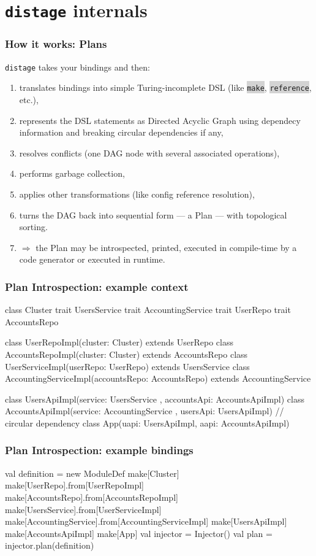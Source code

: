 \documentclass[usenames,dvipsnames]{beamer}
\newcommand{\code}[1]{\colorbox{lightgray}{\texttt{#1}}}
\newcommand{\distage}{\texttt{distage}\xspace}
\begin{document}
\section{\distage{} internals}
\begin{frame}
  \frametitle{How it works: Plans}
  \distage takes your bindings and then:
  \begin{enumerate}
    \item translates bindings into simple Turing-incomplete DSL (like \code{make}, \code{reference}, etc.),
    \item represents the DSL statements as Directed Acyclic Graph using dependecy information and breaking circular dependencies if any,
    \item resolves conflicts (one DAG node with several associated operations),
    \item performs garbage collection,
    \item applies other transformations (like config reference resolution),
    \item turns the DAG back into sequential form --- a Plan --- with topological sorting.
    \item $\Rightarrow$ the Plan may be introspected, printed, executed in compile-time by a code generator or executed in runtime.
  \end{enumerate}
\end{frame}

\begin{frame}[fragile]
\frametitle{Plan Introspection: example context}
\begin{scalacode}
class Cluster
trait UsersService
trait AccountingService
trait UserRepo
trait AccountsRepo

class UserRepoImpl(cluster: Cluster) extends UserRepo
class AccountsRepoImpl(cluster: Cluster) extends AccountsRepo
class UserServiceImpl(userRepo: UserRepo) extends UsersService
class AccountingServiceImpl(accountsRepo: AccountsRepo)
    extends AccountingService

class UsersApiImpl(service: UsersService
    , accountsApi: AccountsApiImpl)
class AccountsApiImpl(service: AccountingService
    , usersApi: UsersApiImpl) // circular dependency
class App(uapi: UsersApiImpl, aapi: AccountsApiImpl)
\end{scalacode}
\end{frame}

\begin{frame}[fragile]
\frametitle{Plan Introspection: example bindings\footnotemark[1]}
\begin{scalacode}
val definition = new ModuleDef {
    make[Cluster]
    make[UserRepo].from[UserRepoImpl]
    make[AccountsRepo].from[AccountsRepoImpl]
    make[UsersService].from[UserServiceImpl]
    make[AccountingService].from[AccountingServiceImpl]
    make[UsersApiImpl]
    make[AccountsApiImpl]
    make[App]
}
val injector = Injector()
val plan = injector.plan(definition)
\end{scalacode}
\end{frame}
\end{document}
